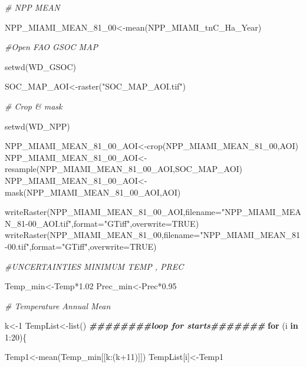 \documentclass[
  10pt,
  b5paper,
]{book}
\newenvironment{Shaded}{\begin{snugshade}}{\end{snugshade}}
\newcommand{\AttributeTok}[1]{\textcolor[rgb]{0.77,0.63,0.00}{#1}}
\newcommand{\CommentTok}[1]{\textcolor[rgb]{0.56,0.35,0.01}{\textit{#1}}}
\newcommand{\ConstantTok}[1]{\textcolor[rgb]{0.00,0.00,0.00}{#1}}
\newcommand{\ControlFlowTok}[1]{\textcolor[rgb]{0.13,0.29,0.53}{\textbf{#1}}}
\newcommand{\DecValTok}[1]{\textcolor[rgb]{0.00,0.00,0.81}{#1}}
\newcommand{\DocumentationTok}[1]{\textcolor[rgb]{0.56,0.35,0.01}{\textbf{\textit{#1}}}}
\newcommand{\FloatTok}[1]{\textcolor[rgb]{0.00,0.00,0.81}{#1}}
\newcommand{\FunctionTok}[1]{\textcolor[rgb]{0.00,0.00,0.00}{#1}}
\newcommand{\NormalTok}[1]{#1}
\newcommand{\OtherTok}[1]{\textcolor[rgb]{0.56,0.35,0.01}{#1}}
\newcommand{\SpecialCharTok}[1]{\textcolor[rgb]{0.00,0.00,0.00}{#1}}
\newcommand{\StringTok}[1]{\textcolor[rgb]{0.31,0.60,0.02}{#1}}
\begin{document}
\begin{Shaded}
\begin{Highlighting}[]
\CommentTok{\# NPP MEAN}

\NormalTok{NPP\_MIAMI\_MEAN\_81\_00}\OtherTok{\textless{}{-}}\FunctionTok{mean}\NormalTok{(NPP\_MIAMI\_tnC\_Ha\_Year)}


\CommentTok{\#Open FAO GSOC MAP }

\FunctionTok{setwd}\NormalTok{(WD\_GSOC)}

\NormalTok{SOC\_MAP\_AOI}\OtherTok{\textless{}{-}}\FunctionTok{raster}\NormalTok{(}\StringTok{"SOC\_MAP\_AOI.tif"}\NormalTok{)}

\CommentTok{\# Crop \& mask}

\FunctionTok{setwd}\NormalTok{(WD\_NPP)}

\NormalTok{NPP\_MIAMI\_MEAN\_81\_00\_AOI}\OtherTok{\textless{}{-}}\FunctionTok{crop}\NormalTok{(NPP\_MIAMI\_MEAN\_81\_00,AOI)}
\NormalTok{NPP\_MIAMI\_MEAN\_81\_00\_AOI}\OtherTok{\textless{}{-}}\FunctionTok{resample}\NormalTok{(NPP\_MIAMI\_MEAN\_81\_00\_AOI,SOC\_MAP\_AOI)}
\NormalTok{NPP\_MIAMI\_MEAN\_81\_00\_AOI}\OtherTok{\textless{}{-}}\FunctionTok{mask}\NormalTok{(NPP\_MIAMI\_MEAN\_81\_00\_AOI,AOI)}

\FunctionTok{writeRaster}\NormalTok{(NPP\_MIAMI\_MEAN\_81\_00\_AOI,}\AttributeTok{filename=}\StringTok{"NPP\_MIAMI\_MEAN\_81{-}00\_AOI.tif"}\NormalTok{,}\AttributeTok{format=}\StringTok{"GTiff"}\NormalTok{,}\AttributeTok{overwrite=}\ConstantTok{TRUE}\NormalTok{)}
\FunctionTok{writeRaster}\NormalTok{(NPP\_MIAMI\_MEAN\_81\_00,}\AttributeTok{filename=}\StringTok{"NPP\_MIAMI\_MEAN\_81{-}00.tif"}\NormalTok{,}\AttributeTok{format=}\StringTok{"GTiff"}\NormalTok{,}\AttributeTok{overwrite=}\ConstantTok{TRUE}\NormalTok{)}


\CommentTok{\#UNCERTAINTIES MINIMUM TEMP , PREC}

\NormalTok{Temp\_min}\OtherTok{\textless{}{-}}\NormalTok{Temp}\SpecialCharTok{*}\FloatTok{1.02}
\NormalTok{Prec\_min}\OtherTok{\textless{}{-}}\NormalTok{Prec}\SpecialCharTok{*}\FloatTok{0.95}

\CommentTok{\# Temperature Annual Mean }

\NormalTok{k}\OtherTok{\textless{}{-}}\DecValTok{1}
\NormalTok{TempList}\OtherTok{\textless{}{-}}\FunctionTok{list}\NormalTok{()}
\DocumentationTok{\#\#\#\#\#\#\#\#loop for starts\#\#\#\#\#\#\#}
\ControlFlowTok{for}\NormalTok{ (i }\ControlFlowTok{in} \DecValTok{1}\SpecialCharTok{:}\DecValTok{20}\NormalTok{)\{}

\NormalTok{Temp1}\OtherTok{\textless{}{-}}\FunctionTok{mean}\NormalTok{(Temp\_min[[k}\SpecialCharTok{:}\NormalTok{(k}\SpecialCharTok{+}\DecValTok{11}\NormalTok{)]])}
\NormalTok{TempList[i]}\OtherTok{\textless{}{-}}\NormalTok{Temp1}


\end{Highlighting}
\end{Shaded}
\end{document}
